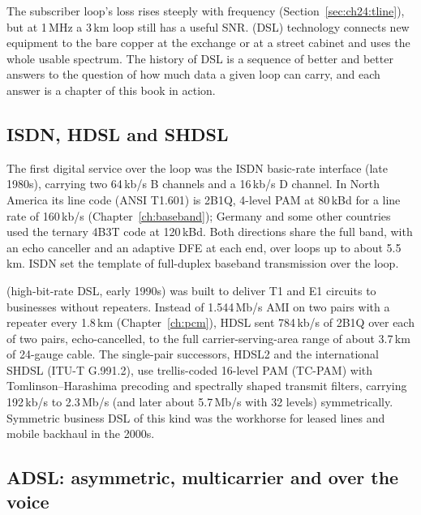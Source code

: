 The subscriber loop's loss rises steeply with frequency (Section~\ref{sec:ch24:tline}), but at
1\,MHz a 3\,km loop still has a useful SNR.  (DSL) technology connects
new equipment to the bare copper at the exchange or at a street cabinet and uses the whole usable
spectrum. The history of DSL is a sequence of better and better answers to the question of how much
data a given loop can carry, and each answer is a chapter of this book in action.

\subsection{ISDN, HDSL and SHDSL}

The first digital service over the loop was the ISDN basic-rate interface (late 1980s), carrying two
64\,kb/s B channels and a 16\,kb/s D channel. In North America its line code (ANSI T1.601) is 2B1Q,
4-level PAM at 80\,kBd for a line rate of 160\,kb/s (Chapter~\ref{ch:baseband}); Germany and some
other countries used the ternary 4B3T code at 120\,kBd. Both directions share the full band, with
an echo canceller and an adaptive DFE at each end, over loops up to about 5.5\,km. ISDN set the
template of full-duplex baseband transmission over the loop.



 (high-bit-rate DSL, early 1990s) was built to deliver T1 and E1 circuits to businesses
without repeaters. Instead of 1.544\,Mb/s AMI on two pairs with a repeater every 1.8\,km
(Chapter~\ref{ch:pcm}), HDSL sent 784\,kb/s of 2B1Q over each of two pairs, echo-cancelled, to the
full carrier-serving-area range of about 3.7\,km of 24-gauge cable. The single-pair successors,
HDSL2 and the international SHDSL (ITU-T G.991.2), use trellis-coded 16-level PAM (TC-PAM) with
Tomlinson--Harashima precoding and spectrally shaped transmit filters, carrying 192\,kb/s to
2.3\,Mb/s (and later about 5.7\,Mb/s with 32 levels) symmetrically. Symmetric business DSL of this
kind was the workhorse for leased lines and mobile backhaul in the 2000s.

\subsection{ADSL: asymmetric, multicarrier and over the voice}

